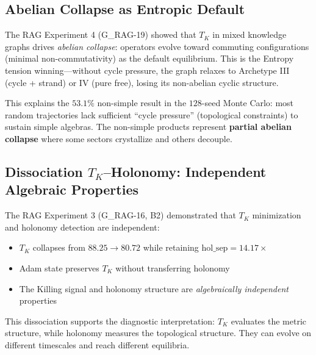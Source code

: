 \subsection{Abelian Collapse as Entropic Default}\label{sec:abelian_collapse}

The RAG Experiment 4 (G\_RAG-19) showed that $T_K$ in mixed knowledge graphs drives \emph{abelian collapse}: operators evolve toward commuting configurations (minimal non-commutativity) as the default equilibrium. This is the Entropy tension winning---without cycle pressure, the graph relaxes to Archetype III (cycle + strand) or IV (pure free), losing its non-abelian cyclic structure.

This explains the $53.1\%$ non-simple result in the $128$-seed Monte Carlo: most random trajectories lack sufficient ``cycle pressure'' (topological constraints) to sustain simple algebras. The non-simple products represent \textbf{partial abelian collapse} where some sectors crystallize and others decouple.

\subsection{Dissociation $T_K$--Holonomy: Independent Algebraic Properties}\label{sec:tk_holonomy_dissociation}

The RAG Experiment 3 (G\_RAG-16, B2) demonstrated that $T_K$ minimization and holonomy detection are independent:

\begin{itemize}
    \item $T_K$ collapses from $88.25 \to 80.72$ while retaining $\mathrm{hol\_sep} = 14.17\times$
    \item Adam state preserves $T_K$ without transferring holonomy
    \item The Killing signal and holonomy structure are \emph{algebraically independent} properties
\end{itemize}

This dissociation supports the diagnostic interpretation: $T_K$ evaluates the metric structure, while holonomy measures the topological structure. They can evolve on different timescales and reach different equilibria.
